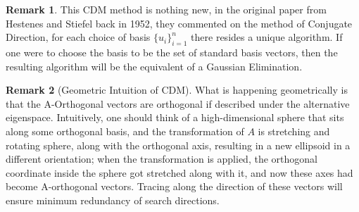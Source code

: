 \documentclass[]{article}
\theoremstyle{definition}
\newtheorem{remark}{Remark}[subsection]  %
\begin{document}
            \begin{remark}
                This CDM method is nothing new, in the original paper from Hestenes and Stiefel back in 1952\cite{paper:cg_original}, they commented on the method of Conjugate Direction, for each choice of basis $\{u_i\}_{i = 1}^n$ there resides a unique algorithm. If one were to choose the basis to be the set of standard basis vectors, then the resulting algorithm will be the equivalent of a Gaussian Elimination. 
            \end{remark}
            \begin{remark}[Geometric Intuition of CDM]
                What is happening geometrically is that the A-Orthogonal vectors are orthogonal if described under the alternative eigenspace. Intuitively, one should think of a high-dimensional sphere that sits along some orthogonal basis, and the transformation of $A$ is stretching and rotating sphere, along with the orthogonal axis, resulting in a new ellipsoid in a different orientation; when the transformation is applied, the orthogonal coordinate inside the sphere got stretched along with it, and now these axes had become A-orthogonal vectors. Tracing along the direction of these vectors will ensure minimum redundancy of search directions. 
            \end{remark}
\end{document}
